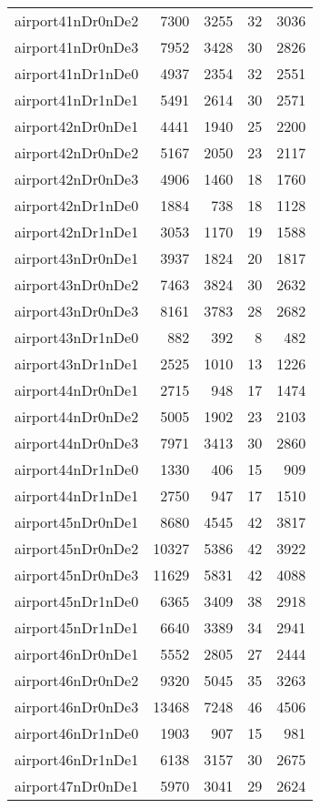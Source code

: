 \begin{longtable}{lrrrr}
airport41nDr0nDe2 & 7300 & 3255 & 32 & 3036 \\
airport41nDr0nDe3 & 7952 & 3428 & 30 & 2826 \\
airport41nDr1nDe0 & 4937 & 2354 & 32 & 2551 \\
airport41nDr1nDe1 & 5491 & 2614 & 30 & 2571 \\
airport42nDr0nDe1 & 4441 & 1940 & 25 & 2200 \\
airport42nDr0nDe2 & 5167 & 2050 & 23 & 2117 \\
airport42nDr0nDe3 & 4906 & 1460 & 18 & 1760 \\
airport42nDr1nDe0 & 1884 & 738 & 18 & 1128 \\
airport42nDr1nDe1 & 3053 & 1170 & 19 & 1588 \\
airport43nDr0nDe1 & 3937 & 1824 & 20 & 1817 \\
airport43nDr0nDe2 & 7463 & 3824 & 30 & 2632 \\
airport43nDr0nDe3 & 8161 & 3783 & 28 & 2682 \\
airport43nDr1nDe0 & 882 & 392 & 8 & 482 \\
airport43nDr1nDe1 & 2525 & 1010 & 13 & 1226 \\
airport44nDr0nDe1 & 2715 & 948 & 17 & 1474 \\
airport44nDr0nDe2 & 5005 & 1902 & 23 & 2103 \\
airport44nDr0nDe3 & 7971 & 3413 & 30 & 2860 \\
airport44nDr1nDe0 & 1330 & 406 & 15 & 909 \\
airport44nDr1nDe1 & 2750 & 947 & 17 & 1510 \\
airport45nDr0nDe1 & 8680 & 4545 & 42 & 3817 \\
airport45nDr0nDe2 & 10327 & 5386 & 42 & 3922 \\
airport45nDr0nDe3 & 11629 & 5831 & 42 & 4088 \\
airport45nDr1nDe0 & 6365 & 3409 & 38 & 2918 \\
airport45nDr1nDe1 & 6640 & 3389 & 34 & 2941 \\
airport46nDr0nDe1 & 5552 & 2805 & 27 & 2444 \\
airport46nDr0nDe2 & 9320 & 5045 & 35 & 3263 \\
airport46nDr0nDe3 & 13468 & 7248 & 46 & 4506 \\
airport46nDr1nDe0 & 1903 & 907 & 15 & 981 \\
airport46nDr1nDe1 & 6138 & 3157 & 30 & 2675 \\
airport47nDr0nDe1 & 5970 & 3041 & 29 & 2624 \\

\end{longtable}
